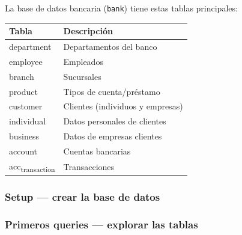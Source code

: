 La base de datos bancaria (\texttt{bank}) tiene estas tablas principales:

{\def\LTcaptype{none} %
\begin{longtable}[]{@{}ll@{}}
\toprule\noalign{}
Tabla & Descripción \\
\midrule\noalign{}
\endhead
\bottomrule\noalign{}
\endlastfoot
department & Departamentos del banco \\
employee & Empleados \\
branch & Sucursales \\
product & Tipos de cuenta/préstamo \\
customer & Clientes (individuos y empresas) \\
individual & Datos personales de clientes \\
business & Datos de empresas clientes \\
account & Cuentas bancarias \\
acc\textsubscript{transaction} & Transacciones \\
\end{longtable}
}

\subsubsection{Setup --- crear la base de datos}\label{setup-crear-la-base-de-datos}

\begin{Shaded}
\begin{Highlighting}[]
\end{Highlighting}
\end{Shaded}

\subsubsection{Primeros queries --- explorar las tablas}\label{primeros-queries-explorar-las-tablas}

\begin{Shaded}
\begin{Highlighting}[]
\end{Highlighting}
\end{Shaded}

